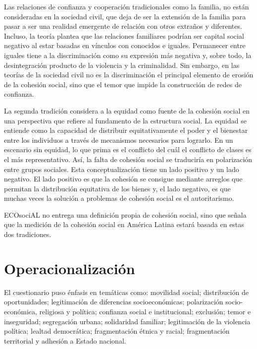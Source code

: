 \documentclass[
  12pt,
]{book}
\begin{document}
Las relaciones de confianza y cooperación tradicionales como la familia, no están consideradas en la sociedad civil, que deja de ser la extensión de la familia para pasar a ser una realidad emergente de relación con otros extraños y diferentes. Incluso, la teoría plantea que las relaciones familiares podrían ser capital social negativo al estar basadas en vínculos con conocidos e iguales. Permanecer entre iguales tiene a la discriminación como su expresión más negativa y, sobre todo, la desintegración producto de la violencia y la criminalidad. Sin embargo, en las teorías de la sociedad civil no es la discriminación el principal elemento de erosión de la cohesión social, sino que el temor que impide la construcción de redes de confianza. \citep{valenzuela_Vinculos_2008}

La segunda tradición considera a la equidad como fuente de la cohesión social en una perspectiva que refiere al fundamento de la estructura social. La equidad se entiende como la capacidad de distribuir equitativamente el poder y el bienestar entre los individuos a través de mecanismos necesarios para lograrlo. En un escenario sin equidad, lo que prima es el conflicto del cuál el conflicto de clases es el más representativo. Así, la falta de cohesión social se traduciría en polarización entre grupos sociales. Esta conceptualización tiene un lado positivo y un lado negativo. El lado positivo es que la cohesión se consigue mediante arreglos que permitan la distribución equitativa de los bienes y, el lado negativo, es que muchas veces la solución a problemas de cohesión social es el autoritarismo.

ECOsociAL no entrega una definición propia de cohesión social, sino que señala que la medición de la cohesión social en América Latina estará basada en estas dos tradiciones.

\hypertarget{operacionalizaciuxf3n}{%
\section{Operacionalización}\label{operacionalizaciuxf3n}}

El cuestionario puso énfasis en temáticas como: movilidad social; distribución de oportunidades; legitimación de diferencias socioeconómicas; polarización socio-económica, religiosa y política; confianza social e institucional; exclusión; temor e inseguridad; segregación urbana; solidaridad familiar; legitimación de la violencia política; lealtad democrática; fragmentación étnica y racial; fragmentación territorial y adhesión a Estado nacional.
\end{document}
